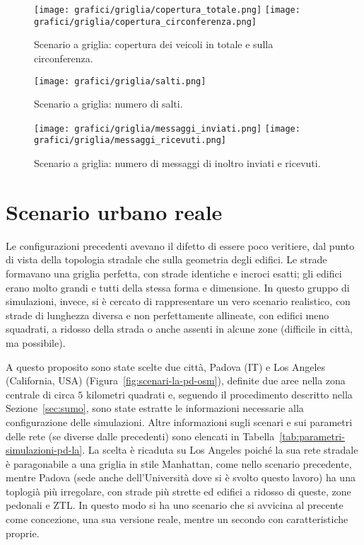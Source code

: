 %
\begin{figure}[htbp]
	\centering
		\texttt{[image: grafici/griglia/copertura\_totale.png]}
		\texttt{[image: grafici/griglia/copertura\_circonferenza.png]}
\caption{Scenario a griglia: copertura dei veicoli in totale e sulla circonferenza.\label{fig:risultati-griglia-copertura}}
\end{figure}
%
\begin{figure}[htbp]
	\centering
		\texttt{[image: grafici/griglia/salti.png]}
\caption{Scenario a griglia: numero di salti.\label{fig:risultati-griglia-salti}}
\end{figure}
%
\begin{figure}[htbp]
	\centering
		\texttt{[image: grafici/griglia/messaggi\_inviati.png]}
		\texttt{[image: grafici/griglia/messaggi\_ricevuti.png]}
\caption{Scenario a griglia: numero di messaggi di inoltro inviati e ricevuti.\label{fig:risultati-griglia-messaggi}}
\end{figure}
\clearpage
%
%
\section{Scenario urbano reale}\label{sec:configurazione-la-pd} %
Le configurazioni precedenti avevano il difetto di essere poco veritiere, dal punto di vista della topologia stradale
che sulla geometria degli edifici.
Le strade formavano una griglia perfetta, con strade identiche e incroci esatti;
gli edifici erano molto grandi e tutti della stessa forma e dimensione.
In questo gruppo di simulazioni, invece, si è cercato di rappresentare un vero scenario realistico,
con strade di lunghezza diversa e non perfettamente allineate,
con edifici meno squadrati, a ridosso della strada o anche assenti in alcune zone (difficile in città, ma possibile).

A questo proposito sono state scelte due città, Padova (IT) e Los Angeles (California, USA) (Figura~\ref{fig:scenari-la-pd-osm}), definite due aree nella zona centrale di circa $5$ kilometri quadrati
e, seguendo il procedimento descritto nella Sezione~\ref{sec:sumo}, sono state estratte le informazioni necessarie alla configurazione delle simulazioni.
Altre informazioni sugli scenari e sui parametri delle rete (se diverse dalle precedenti) sono elencati in Tabella~\ref{tab:parametri-simulazioni-pd-la}.
La scelta è ricaduta su Los Angeles poiché la sua rete stradale è paragonabile a una griglia in stile Manhattan, come nello scenario precedente,
mentre Padova (sede anche dell'Università dove si è svolto questo lavoro) ha una toplogià più irregolare, con strade più strette ed edifici a ridosso di queste,
zone pedonali e ZTL.
In questo modo si ha uno scenario che si avvicina al precente come concezione,
una sua versione reale, mentre un secondo con caratteristiche proprie.

